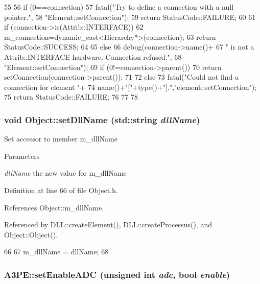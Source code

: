 \begin{DoxyCode}
55                                                       {
56   if (0==connection){
57     fatal("Try to define a connection with a null pointer.",
58         "Element::setConnection");
59     return StatusCode::FAILURE;
60   }
61   if (connection->is(Attrib::INTERFACE)){
62     m_connection=dynamic_cast<Hierarchy*>(connection);
63     return StatusCode::SUCCESS;
64   }
65   else {
66     debug(connection->name()+
67         " is not a Attrib::INTERFACE hardware. Connection refused.",
68         "Element::setConnection");
69     if (0!=connection->parent()){
70       return setConnection(connection->parent());
71     }
72     else{
73       fatal("Could not find a connection for element "+
74           name()+"["+type()+"].","element::setConnection");
75       return StatusCode::FAILURE;
76     }
77   }
78 }
\end{DoxyCode}
\hypertarget{classObject_a870c5af919958c2136623b2d7816d123}{
\subsubsection[{setDllName}]{\setlength{\rightskip}{0pt plus 5cm}void Object::setDllName (std::string {\em dllName})}}
\label{classObject_a870c5af919958c2136623b2d7816d123}
Set accessor to member m\_\-dllName 
\begin{DoxyParams}{Parameters}
\item[{\em dllName}]the new value for m\_\-dllName \end{DoxyParams}


Definition at line 66 of file Object.h.

References Object::m\_\-dllName.

Referenced by DLL::createElement(), DLL::createProcessus(), and Object::Object().


\begin{DoxyCode}
66                                       {
67     m_dllName = dllName;
68   }
\end{DoxyCode}
\hypertarget{classA3PE_a0c90134c3440c8b8c8dc796c43893d64}{
\subsubsection[{setEnableADC}]{ A3PE::setEnableADC (unsigned int {\em adc}, \/  bool {\em enable})}}
\label{classA3PE_a0c90134c3440c8b8c8dc796c43893d64}


